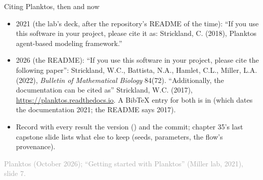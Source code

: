 \documentclass[aspectratio=169,11pt]{beamer}
\newcommand{\sourcecredit}[1]{\vfill\begin{flushright}\tiny\textcolor{DarkGray}{#1}\end{flushright}}
\begin{document}
\begin{frame}{Citing Planktos, then and now}
\label{fr:cite}
\small
\begin{itemize}\setlength{\itemsep}{3pt}
  \item 2021 (the lab's deck, after the repository's README of the time): ``If you use this software in your project, please cite it as: Strickland, C. (2018), Planktos agent-based modeling framework.''
  \item 2026 (the README): ``If you use this software in your project, please cite the following paper'': Strickland, W.C., Battista, N.A., Hamlet, C.L., Miller, L.A. (2022), \emph{Bulletin of Mathematical Biology} 84(72). ``Additionally, the documentation can be cited as'' Strickland, W.C. (2017), \url{https://planktos.readthedocs.io}. A BibTeX entry for both is in  (which dates the documentation 2021; the README says 2017).
  \item Record with every result the version () and the commit; chapter 35's last capstone slide lists what else to keep (seeds, parameters, the flow's provenance).
\end{itemize}
\sourcecredit{Planktos  (October 2026); ``Getting started with Planktos'' (Miller lab, 2021), slide 7.}
\end{frame}
\end{document}
